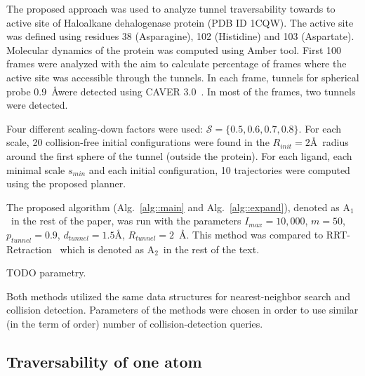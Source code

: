 \documentclass[usletter, 10pt, conference]{ieeeconf} %
\def\dt{d_{tunnel}}
\def\RI{R_{init}}
\def\rv{R_{tunnel}}
\def\Imax{I_{max}} %
\def\smin{s_{min}}
\def\gb{p_{tunnel}}
\def\S{\mathcal{S}}
\def\LA{L_1}
\def\LB{L_2}
\def\RA{A$_{1}$}
\def\RB{A$_{2}$}
\begin{document}
The proposed approach was used to analyze tunnel traversability towards to active site of Haloalkane dehalogenase protein (PDB ID 1CQW).
The active site was defined using residues 38 (Asparagine), 102 (Histidine) and 103 (Aspartate).
Molecular dynamics of the protein was computed using Amber tool. 
First 100 frames were analyzed with the aim to calculate percentage of frames where the active site was accessible through the tunnels.
In each frame, tunnels for spherical probe 0.9~\AA were detected using CAVER 3.0~\cite{caver3}. 
In most of the frames, two tunnels were detected.


Four different scaling-down factors were used: $\S=\{0.5,0.6,0.7,0.8\}$.
For each scale, 20 collision-free initial configurations were found in the $\RI=2$\AA\ radius around the first sphere of the tunnel (outside the protein).
For each ligand, each minimal scale $\smin$ and each initial configuration, 10 trajectories were computed using the proposed planner.

The proposed algorithm (Alg.~\ref{alg::main} and Alg.~\ref{alg::expand}), denoted as \RA\ in the rest of the paper, was run
with the parameters $\Imax=10,000$, $m=50$, $\gb=0.9$, $\dt=1.5$\AA, $\rv=2$~\AA.
This method was compared to RRT-Retraction~\cite{zhangRetraction} which is denoted as \RB\ in the rest of the text.

TODO parametry.

Both methods utilized the same data structures for nearest-neighbor search and collision detection.
Parameters of the methods were chosen in order to use similar (in the term of order) number of collision-detection queries.

\subsection{Traversability of one atom}
\end{document}

